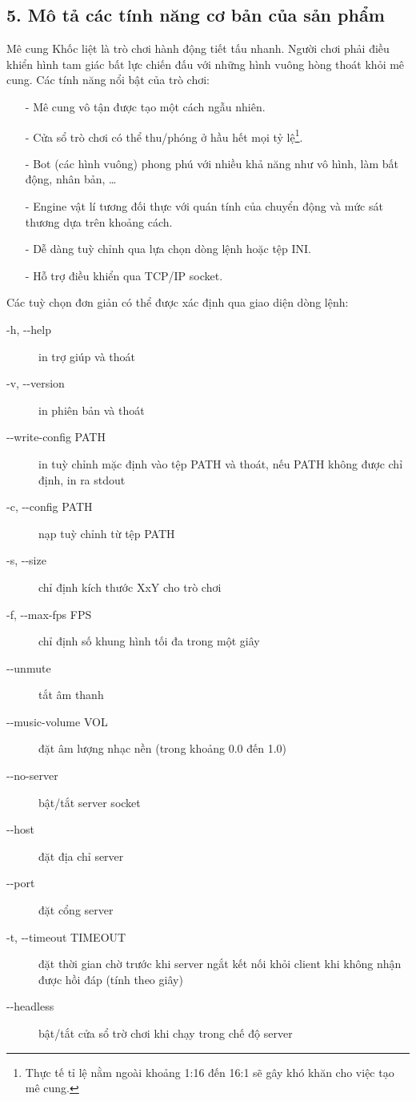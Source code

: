\documentclass[a4paper,11pt]{article}
\begin{document}
\subsection*{5. Mô tả các tính năng cơ bản của sản phẩm}
Mê cung Khốc liệt là trò chơi hành động tiết tấu nhanh. Người chơi phải điều
khiển hình tam giác bất lực chiến đấu với những hình vuông hòng thoát khỏi mê
cung. Các tính năng nổi bật của trò chơi:

\begin{itemize}
  \item[-] Mê cung vô tận được tạo một cách ngẫu nhiên.
  \item[-] Cửa sổ trò chơi có thể thu/phóng ở hầu hết mọi tỷ lệ\footnote{Thực tế
    tỉ lệ nằm ngoài khoảng 1:16 đến 16:1 sẽ gây khó khăn cho việc tạo mê cung.}.
  \item[-] Bot (các hình vuông) phong phú với nhiều khả năng như vô hình, làm
    bất động, nhân bản, \ldots
  \item[-] Engine vật lí tương đối thực với quán tính của chuyển động và mức sát
    thương dựa trên khoảng cách.
  \item[-] Dễ dàng tuỳ chỉnh qua lựa chọn dòng lệnh hoặc tệp INI.
  \item[-] Hỗ trợ điều khiển qua TCP/IP socket.
\end{itemize}
Các tuỳ chọn đơn giản có thể được xác định qua giao diện dòng lệnh:
\begin{description}
  \item[-h, -{}-help] in trợ giúp và thoát
  \item[-v, -{}-version] in phiên bản và thoát
  \item[-{}-write-config \lbrack PATH\rbrack ] in tuỳ chỉnh mặc định vào tệp PATH
    và thoát, nếu PATH không được chỉ định, in ra stdout
  \item[-c, -{}-config PATH] nạp tuỳ chỉnh từ tệp PATH
  \item[-s, -{}-size] chỉ định kích thước XxY cho trò chơi
  \item[-f, -{}-max-fps FPS] chỉ định số khung hình tối đa trong một giây
  \item[-{}-\lbrack un\rbrack mute] tắt âm thanh
  \item[-{}-music-volume VOL] đặt âm lượng nhạc nền (trong khoảng 0.0 đến 1.0)
  \item[-{}-\lbrack no-\rbrack server] bật/tắt server socket
  \item[-{}-host] đặt địa chỉ server
  \item[-{}-port] đặt cổng server
  \item[-t, -{}-timeout TIMEOUT] đặt thời gian chờ trước khi server ngắt kết nối
    khỏi client khi không nhận được hồi đáp (tính theo giây)
  \item[-{}-head\lbrack less\rbrack] bật/tắt cửa sổ trờ chơi khi chạy trong chế
    độ server
\end{description}
\end{document}
